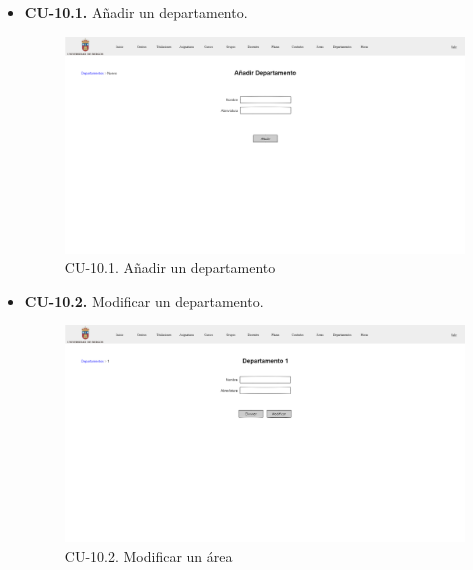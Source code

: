 \begin{itemize}
	\item \textbf{CU-10.1.} Añadir un departamento.
	\begin{figure}[!h]
		\centering
		\includegraphics[width=\textwidth]{../img/Anexos/Vistas/add_departamento.png}
		\caption{CU-10.1. Añadir un departamento}\label{fig:../img/Anexos/Vistas/add_departamento.png}
	\end{figure}
	
	\item \textbf{CU-10.2.} Modificar un departamento.
	\begin{figure}[!h]
		\centering
		\includegraphics[width=\textwidth]{../img/Anexos/Vistas/mod_departamento.png}
		\caption{CU-10.2. Modificar un área}\label{fig:../img/Anexos/Vistas/mod_departamento.png}
	\end{figure}
	

\end{itemize}
